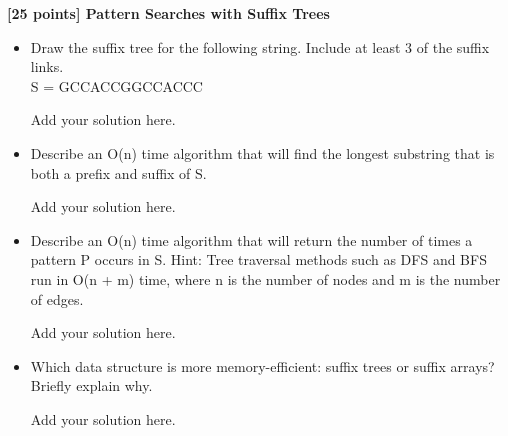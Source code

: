 {\bf [25 points] Pattern Searches with Suffix Trees}\\

\vspace{0.1in}



\begin{itemize}
 

    \item Draw the suffix tree for the following string. Include at least 3 of the suffix links. \\
    S = GCCACCGGCCACCC
    \begin{solution}
    Add your solution here.
    \end{solution}

    \item Describe an O(n) time algorithm that will find the longest substring that is both a prefix and suffix of S.
    \begin{solution}
    Add your solution here.
    \end{solution}
    
    \item Describe an O(n) time algorithm that will return the number of times a pattern P occurs in S. Hint: Tree traversal methods such as DFS and BFS run in O(n + m) time, where n is the number of nodes and m is the number of edges.

    \begin{solution}
    Add your solution here.
    \end{solution}

    \item Which data structure is more memory-efficient: suffix trees or suffix arrays? Briefly explain why.

    \begin{solution}
    Add your solution here.
    \end{solution}
\end{itemize}

